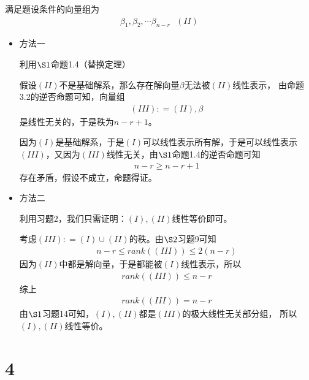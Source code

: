 \documentclass{article}
\begin{document}
满足题设条件的向量组为
\begin{align*}
  \beta_1, \beta_2, \cdots \beta_{n - r} \ \ \ (II)
\end{align*}

\begin{itemize}
  \item 方法一

        利用$\S 1$命题1.4（替换定理）

        假设$(II)$不是基础解系，那么存在解向量$\beta$无法被$(II)$线性表示，
        由命题3.2的逆否命题可知，向量组
        \begin{align*}
         (III) : = (II), \beta
        \end{align*}
        是线性无关的，于是秩为$n - r + 1$。

        因为$(I)$是基础解系，于是$(I)$可以线性表示所有解，于是可以线性表示
        $(III)$，又因为$(III)$线性无关，由$\S 1$命题1.4的逆否命题可知
        \begin{align*}
          n - r \geq n - r + 1
        \end{align*}
        存在矛盾，假设不成立，命题得证。

  \item 方法二

        利用习题2，我们只需证明：$(I), (II)$线性等价即可。

        考虑$(III) : = (I) \cup (II)$的秩。由$\S 2$习题9可知
        \begin{align*}
          n - r \leq rank((III)) \leq 2(n - r)
        \end{align*}
        因为$(II)$中都是解向量，于是都能被$(I)$线性表示，所以
        \begin{align*}
          rank((III)) \leq n - r
        \end{align*}
        综上
        \begin{align*}
          rank((III)) = n - r
        \end{align*}
        由$\S1$习题14可知，$(I),(II)$都是$(III)$的极大线性无关部分组，
        所以$(I), (II)$线性等价。
\end{itemize}

\section*{4}
\end{document}
